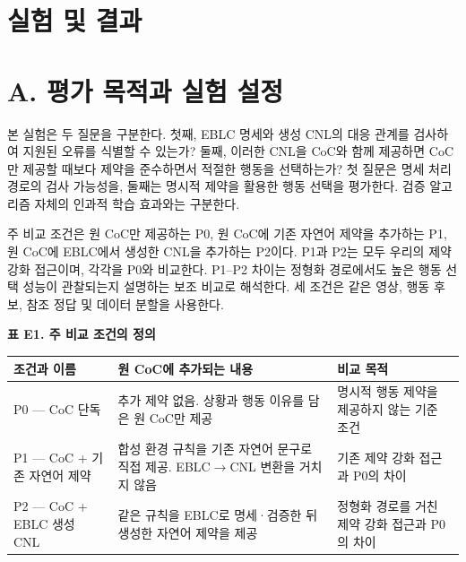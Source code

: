\documentclass[11pt,a4paper]{article}
\begin{document}
\section*{실험 및 결과}

\section*{A. 평가 목적과 실험 설정}

본 실험은 두 질문을 구분한다. 첫째, EBLC 명세와 생성 CNL의 대응 관계를 검사하여 지원된 오류를 식별할 수 있는가? 둘째, 이러한 CNL을 CoC와 함께 제공하면 CoC만 제공할 때보다 제약을 준수하면서 적절한 행동을 선택하는가? 첫 질문은 명세 처리 경로의 검사 가능성을, 둘째는 명시적 제약을 활용한 행동 선택을 평가한다. 검증 알고리즘 자체의 인과적 학습 효과와는 구분한다.\par

주 비교 조건은 원 CoC만 제공하는 P0, 원 CoC에 기존 자연어 제약을 추가하는 P1, 원 CoC에 EBLC에서 생성한 CNL을 추가하는 P2이다. P1과 P2는 모두 우리의 제약 강화 접근이며, 각각을 P0와 비교한다. P1–P2 차이는 정형화 경로에서도 높은 행동 선택 성능이 관찰되는지 설명하는 보조 비교로 해석한다. 세 조건은 같은 영상, 행동 후보, 참조 정답 및 데이터 분할을 사용한다.\par

\par\medskip\noindent\begin{minipage}{\linewidth}
\textbf{표 E1. 주 비교 조건의 정의}\par

\par\medskip\noindent\begin{minipage}{\linewidth}\small
\begin{tabular}{@{}>{\raggedright\arraybackslash}p{}>{\raggedright\arraybackslash}p{}>{\raggedright\arraybackslash}p{}@{}}
\toprule
\textbf{조건과 이름} & \textbf{원 CoC에 추가되는 내용} & \textbf{비교 목적} \\
\midrule
P0 — CoC 단독 & 추가 제약 없음. 상황과 행동 이유를 담은 원 CoC만 제공 & 명시적 행동 제약을 제공하지 않는 기준 조건 \\
P1 — CoC + 기존 자연어 제약 & 합성 환경 규칙을 기존 자연어 문구로 직접 제공. EBLC\ensuremath{\rightarrow}CNL 변환을 거치지 않음 & 기존 제약 강화 접근과 P0의 차이 \\
P2 — CoC + EBLC 생성 CNL & 같은 규칙을 EBLC로 명세·검증한 뒤 생성한 자연어 제약을 제공 & 정형화 경로를 거친 제약 강화 접근과 P0의 차이 \\
\bottomrule\end{tabular}\end{minipage}\par\medskip
\end{minipage}\par\medskip
\end{document}
